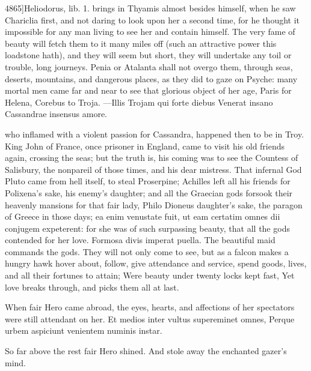 4865]Heliodorus, lib. 1. brings in Thyamis almost besides himself, when
he saw Chariclia first, and not daring to look upon her a second time,
for he thought it impossible for any man living to see her and contain
himself. The very fame of beauty will fetch them to it many miles off
(such an attractive power this loadstone hath), and they will seem but
short, they will undertake any toil or trouble, long journeys.
Penia or Atalanta shall not overgo them, through seas, deserts,
mountains, and dangerous places, as they did to gaze on Psyche: many
mortal men came far and near to see that glorious object of her age,
Paris for Helena, Corebus to Troja.
---Illis Trojam qui forte diebus
Venerat insano Cassandrae insensus amore.

who inflamed with a violent passion for Cassandra, happened then to be
in Troy. King John of France, once prisoner in England, came to visit
his old friends again, crossing the seas; but the truth is, his coming
was to see the Countess of Salisbury, the nonpareil of those times, and
his dear mistress. That infernal God Pluto came from hell itself, to
steal Proserpine; Achilles left all his friends for Polixena's sake,
his enemy's daughter; and all the Graecian gods forsook their
heavenly mansions for that fair lady, Philo Dioneus daughter's sake,
the paragon of Greece in those days; ea enim venustate fuit, ut eam
certatim omnes dii conjugem expeterent: for she was of such surpassing
beauty, that all the gods contended for her love. Formosa divis
imperat puella. The beautiful maid commands the gods. They will not
only come to see, but as a falcon makes a hungry hawk hover about,
follow, give attendance and service, spend goods, lives, and all their
fortunes to attain;
Were beauty under twenty locks kept fast,
Yet love breaks through, and picks them all at last.

When fair Hero came abroad, the eyes, hearts, and affections of
her spectators were still attendant on her.
Et medios inter vultus supereminet omnes,
Perque urbem aspiciunt venientem numinis instar.

So far above the rest fair Hero shined.
And stole away the enchanted gazer's mind.

